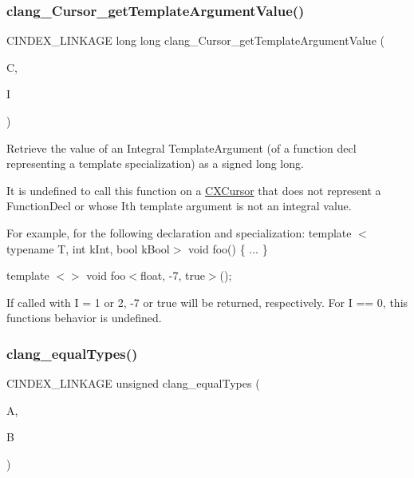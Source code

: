 \subsubsection{\texorpdfstring{clang\+\_\+\+Cursor\+\_\+get\+Template\+Argument\+Value()}{clang\_Cursor\_getTemplateArgumentValue()}}
{\footnotesize\ttfamily C\+I\+N\+D\+E\+X\+\_\+\+L\+I\+N\+K\+A\+GE long long clang\+\_\+\+Cursor\+\_\+get\+Template\+Argument\+Value (\begin{DoxyParamCaption}\item[{\mbox{\hyperlink{structCXCursor}{C\+X\+Cursor}}}]{C,  }\item[{unsigned}]{I }\end{DoxyParamCaption})}



Retrieve the value of an Integral Template\+Argument (of a function decl representing a template specialization) as a signed long long. 

It is undefined to call this function on a \mbox{\hyperlink{structCXCursor}{C\+X\+Cursor}} that does not represent a Function\+Decl or whose I\textquotesingle{}th template argument is not an integral value.

For example, for the following declaration and specialization\+: template $<$typename T, int k\+Int, bool k\+Bool$>$ void foo() \{ ... \}

template $<$$>$ void foo$<$float, -\/7, true$>$();

If called with I = 1 or 2, -\/7 or true will be returned, respectively. For I == 0, this function\textquotesingle{}s behavior is undefined. \mbox{\label{group__CINDEX__TYPES_gac047de2ab0f7e1b1586d8317a658a1d9}} 
\subsubsection{\texorpdfstring{clang\+\_\+equal\+Types()}{clang\_equalTypes()}}
{\footnotesize\ttfamily C\+I\+N\+D\+E\+X\+\_\+\+L\+I\+N\+K\+A\+GE unsigned clang\+\_\+equal\+Types (\begin{DoxyParamCaption}\item[{\mbox{\hyperlink{structCXType}{C\+X\+Type}}}]{A,  }\item[{\mbox{\hyperlink{structCXType}{C\+X\+Type}}}]{B }\end{DoxyParamCaption})}



